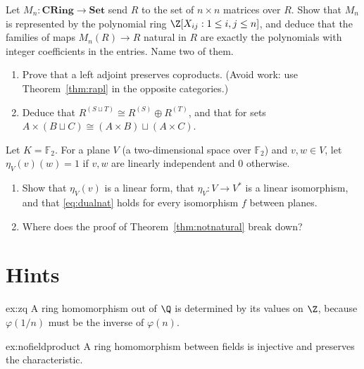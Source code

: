 \begin{exercise}[$\star$]\label{ex:matrixpoly}
Let $M_n\colon\mathbf{CRing}\to\mathbf{Set}$ send $R$ to the set of $n\times n$ matrices over $R$. Show that $M_n$ is represented by the polynomial ring $\Z[X_{ij}:1\le i,j\le n]$, and deduce that the families of maps
$M_n(R)\to R$ natural in $R$ are exactly the polynomials with integer coefficients in the entries. Name two of them.
\end{exercise}

\begin{exercise}[$\star\star$]\label{ex:leftadj}
\leavevmode
\begin{enumerate}[label=(\alph*)]
\item Prove that a left adjoint preserves coproducts. (Avoid work: use Theorem~\ref{thm:rapl} in the opposite categories.)
\item Deduce that $R^{(S\sqcup T)}\cong R^{(S)}\oplus R^{(T)}$, and that for sets $A\times(B\sqcup C)\cong(A\times B)\sqcup(A\times C)$.
\end{enumerate}
\end{exercise}

\begin{exercise}[$\star\star$]\label{ex:f2plane}
Let $K=\mathbb F_2$. For a plane $V$ (a two-dimensional space over $\mathbb F_2$) and $v,w\in V$, let $\eta_V(v)(w)=1$ if $v,w$ are linearly independent and $0$ otherwise.
\begin{enumerate}[label=(\alph*)]
\item Show that $\eta_V(v)$ is a linear form, that $\eta_V\colon V\to V^*$ is a linear isomorphism, and that \eqref{eq:dualnat} holds for every isomorphism $f$ between planes.
\item Where does the proof of Theorem~\ref{thm:notnatural} break down?
\end{enumerate}
\end{exercise}

\section{Hints}

\begin{hint}{ex:zq}
A ring homomorphism out of $\Q$ is determined by its values on $\Z$, because $\varphi(1/n)$ must be the inverse of $\varphi(n)$.
\end{hint}

\begin{hint}{ex:nofieldproduct}
A ring homomorphism between fields is injective and preserves the characteristic.
\end{hint}

